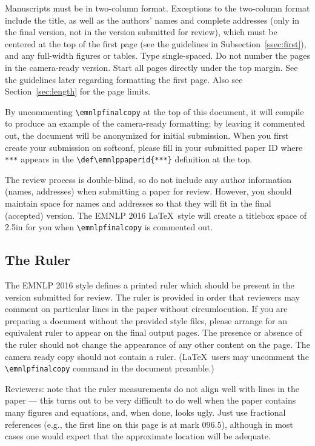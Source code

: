 \documentclass[11pt,letterpaper]{article}
\def\emnlppaperid{***}
\begin{document}
Manuscripts must be in two-column format.  Exceptions to the two-column
format include the title, as well as the authors' names and complete
addresses (only in the final version, not in the version submitted for
review), which must be centered at the top of the first page (see the
guidelines in Subsection~\ref{ssec:first}), and any full-width figures or
tables.  Type single-spaced.  Do not number the pages in the camera-ready
version. Start all pages directly under the top margin.  See the guidelines
later regarding formatting the first page.  Also see 
Section~\ref{sec:length} for the page limits.

By uncommenting {\small\verb|\emnlpfinalcopy|} at the top of this document,
it will compile to produce an example of the camera-ready formatting; by
leaving it commented out, the document will be anonymized for initial
submission.  When you first create your submission on softconf, please fill
in your submitted paper ID where {\small\verb|***|} appears in the
{\small\verb|\def\emnlppaperid{***}|} definition at the top.

The review process is double-blind, so do not include any author information
(names, addresses) when submitting a paper for review. However, you should
maintain space for names and addresses so that they will fit in the final
(accepted) version.  The EMNLP 2016 \LaTeX\ style will create a titlebox
space of 2.5in for you when {\small\verb|\emnlpfinalcopy|} is commented out.

\subsection{The Ruler}
The EMNLP 2016 style defines a printed ruler which should be present in the
version submitted for review.  The ruler is provided in order that
reviewers may comment on particular lines in the paper without
circumlocution.  If you are preparing a document without the provided
style files, please arrange for an equivalent ruler to
appear on the final output pages.  The presence or absence of the ruler
should not change the appearance of any other content on the page.  The
camera ready copy should not contain a ruler. (\LaTeX\ users may uncomment
the {\small\verb|\emnlpfinalcopy|} command in the document preamble.)  

Reviewers:
note that the ruler measurements do not align well with lines in the paper
--- this turns out to be very difficult to do well when the paper contains
many figures and equations, and, when done, looks ugly.  Just use fractional
references (e.g., the first line on this page is at mark $096.5$), although
in most cases one would expect that the approximate location will be
adequate.
\end{document}
